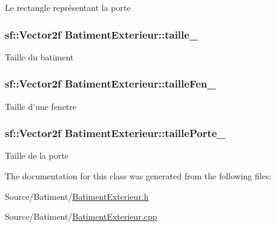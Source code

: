 Le rectangle représentant la porte \hypertarget{classBatimentExterieur_aba1fa0abfce890e24e93619a4a52ab62}{
\subsubsection[{taille\-\_\-}]{\setlength{\rightskip}{0pt plus 5cm}sf\-::\-Vector2f Batiment\-Exterieur\-::taille\-\_\-\hspace{0.3cm}{\ttfamily [private]}}}\label{classBatimentExterieur_aba1fa0abfce890e24e93619a4a52ab62}
Taille du batiment \hypertarget{classBatimentExterieur_a9f70a87570723674f6e1f383942248ef}{
\subsubsection[{taille\-Fen\-\_\-}]{\setlength{\rightskip}{0pt plus 5cm}sf\-::\-Vector2f Batiment\-Exterieur\-::taille\-Fen\-\_\-\hspace{0.3cm}{\ttfamily [private]}}}\label{classBatimentExterieur_a9f70a87570723674f6e1f383942248ef}
Taille d'une fenetre \hypertarget{classBatimentExterieur_afb8fac448d76a2c934a16ec0981f9004}{
\subsubsection[{taille\-Porte\-\_\-}]{\setlength{\rightskip}{0pt plus 5cm}sf\-::\-Vector2f Batiment\-Exterieur\-::taille\-Porte\-\_\-\hspace{0.3cm}{\ttfamily [private]}}}\label{classBatimentExterieur_afb8fac448d76a2c934a16ec0981f9004}
Taille de la porte 

The documentation for this class was generated from the following files\-:\begin{DoxyCompactItemize}
\item 
Source/\-Batiment/\hyperlink{BatimentExterieur_8h}{Batiment\-Exterieur.\-h}\item 
Source/\-Batiment/\hyperlink{Batiment_2BatimentExterieur_8cpp}{Batiment\-Exterieur.\-cpp}\end{DoxyCompactItemize}
